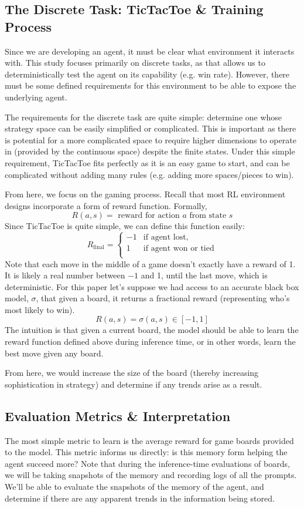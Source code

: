 \documentclass{article}
\begin{document}
\subsection{The Discrete Task: TicTacToe \& Training Process}
Since we are developing an agent, it must be clear what environment it interacts with. This study focuses primarily on discrete tasks, as that allows us to deterministically test the agent on its capability (e.g. win rate). However, there must be some defined requirements for this environment to be able to expose the underlying agent.

The requirements for the discrete task are quite simple: determine one whose strategy space can be easily simplified or complicated. This is important as there is potential for a more complicated space to require higher dimensions to operate in (provided by the continuous space) despite the finite states. Under this simple requirement, TicTacToe fits perfectly as it is an easy game to start, and can be complicated without adding many rules (e.g. adding more spaces/pieces to win).

From here, we focus on the gaming process. Recall that most RL environment designs incorporate a form of reward function. Formally,
$$R(a, s)=\text{ reward for action $a$ from state $s$}$$
Since TicTacToe is quite simple, we can define this function easily:
\[R_{\text{final}} = \begin{cases} 
      -1 & \text{if agent lost,} \\
      1 & \text{if agent won or tied} \\
   \end{cases}
\]
Note that each move in the middle of a game doesn't exactly have a reward of 1. It is likely a real number between $-1$ and 1, until the last move, which is deterministic. For this paper let's suppose we had access to an accurate black box model, $\sigma$, that given a board, it returns a fractional reward (representing who's most likely to win).
$$R(a,s) = \sigma(a, s) \in [-1, 1]$$
The intuition is that given a current board, the model should be able to learn the reward function defined above during inference time, or in other words, learn the best move given any board.

From here, we would increase the size of the board (thereby increasing sophistication in strategy) and determine if any trends arise as a result.

\subsection{Evaluation Metrics \& Interpretation}
The most simple metric to learn is the average reward for game boards provided to the model. This metric informs us directly: is this memory form helping the agent succeed more? Note that during the inference-time evaluations of boards, we will be taking snapshots of the memory and recording logs of all the prompts. We'll be able to evaluate the snapshots of the memory of the agent, and determine if there are any apparent trends in the information being stored.
\end{document}

